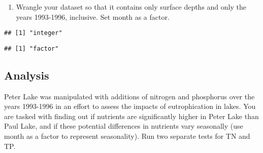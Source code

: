 \documentclass[
]{article}
\newenvironment{Shaded}{\begin{snugshade}}{\end{snugshade}}
\newcommand{\DecValTok}[1]{\textcolor[rgb]{0.00,0.00,0.81}{#1}}
\newcommand{\FloatTok}[1]{\textcolor[rgb]{0.00,0.00,0.81}{#1}}
\newcommand{\KeywordTok}[1]{\textcolor[rgb]{0.13,0.29,0.53}{\textbf{#1}}}
\newcommand{\NormalTok}[1]{#1}
\newcommand{\OperatorTok}[1]{\textcolor[rgb]{0.81,0.36,0.00}{\textbf{#1}}}
\newcommand{\StringTok}[1]{\textcolor[rgb]{0.31,0.60,0.02}{#1}}
\providecommand{\tightlist}{%
  \setlength{\itemsep}{0pt}\setlength{\parskip}{0pt}}
\begin{document}
\begin{enumerate}
\def\labelenumi{\arabic{enumi}.}
\setcounter{enumi}{2}
\tightlist
\item
  Wrangle your dataset so that it contains only surface depths and only
  the years 1993-1996, inclusive. Set month as a factor.
\end{enumerate}

\begin{Shaded}
\end{Shaded}

\begin{verbatim}
## [1] "integer"
\end{verbatim}

\begin{Shaded}
\end{Shaded}

\begin{verbatim}
## [1] "factor"
\end{verbatim}

\hypertarget{analysis}{%
\subsection{Analysis}\label{analysis}}

Peter Lake was manipulated with additions of nitrogen and phosphorus
over the years 1993-1996 in an effort to assess the impacts of
eutrophication in lakes. You are tasked with finding out if nutrients
are significantly higher in Peter Lake than Paul Lake, and if these
potential differences in nutrients vary seasonally (use month as a
factor to represent seasonality). Run two separate tests for TN and TP.
\end{document}
